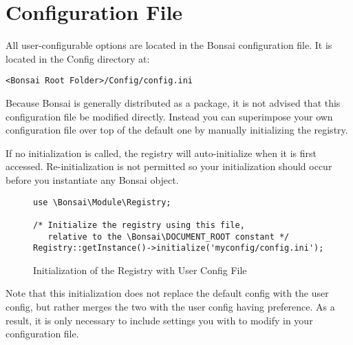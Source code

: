 \documentclass[]{book}
\begin{document}
\section{Configuration File}
All user-configurable options are located in the Bonsai configuration file. It is located in the Config directory at:
\begin{verbatim}
<Bonsai Root Folder>/Config/config.ini
\end{verbatim}

Because Bonsai is generally distributed as a package, it is not advised that this configuration file be modified directly. Instead you can superimpose your own configuration file over top of the default one by manually initializing the registry.

If no initialization is called, the registry will auto-initialize when it is first accessed. Re-initialization is not permitted so your initialization should occur before you instantiate any Bonsai object.

\begin{figure}[H]
	\caption{Initialization of the Registry with User Config File}
	\label{ExampleRenderCall}
	\vspace{12pt}
	\lstset{language=PHP}
	\begin{lstlisting}
use \Bonsai\Module\Registry;

/* Initialize the registry using this file, 
   relative to the \Bonsai\DOCUMENT_ROOT constant */
Registry::getInstance()->initialize('myconfig/config.ini');
	\end{lstlisting}
\end{figure}

Note that this initialization does not replace the default config with the user config, but rather merges the two with the user config having preference. As a result, it is only necessary to include settings you with to modify in your configuration file.
\end{document}
